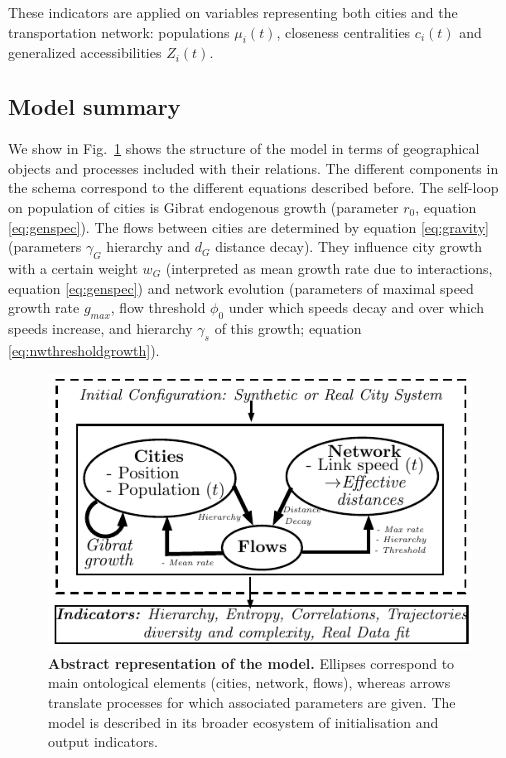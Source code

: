 \documentclass[11pt]{article}
\begin{document}
These indicators are applied on variables representing both cities and the transportation network: populations $\mu_i(t)$, closeness centralities $c_i (t)$ and generalized accessibilities $Z_i (t)$.


\subsection{Model summary}


We show in Fig.~\ref{fig:macrocoevol:model} shows the structure of the model in terms of geographical objects and processes included with their relations. The different components in the schema correspond to the different equations described before. The self-loop on population of cities is Gibrat endogenous growth (parameter $r_0$, equation \ref{eq:genspec}). The flows between cities are determined by equation \ref{eq:gravity} (parameters $\gamma_G$ hierarchy and $d_G$ distance decay). They influence city growth with a certain weight $w_G$ (interpreted as mean growth rate due to interactions, equation \ref{eq:genspec}) and network evolution (parameters of maximal speed growth rate $g_{max}$, flow threshold $\phi_0$ under which speeds decay and over which speeds increase, and hierarchy $\gamma_s$ of this growth; equation \ref{eq:nwthresholdgrowth}).





\begin{figure}
\includegraphics[width=\linewidth]{figures/Fig1.pdf}
\caption{\textbf{Abstract representation of the model.} Ellipses correspond to main ontological elements (cities, network, flows), whereas arrows translate processes for which associated parameters are given. The model is described in its broader ecosystem of initialisation and output indicators.\label{fig:macrocoevol:model}}
\end{figure}
\end{document}
